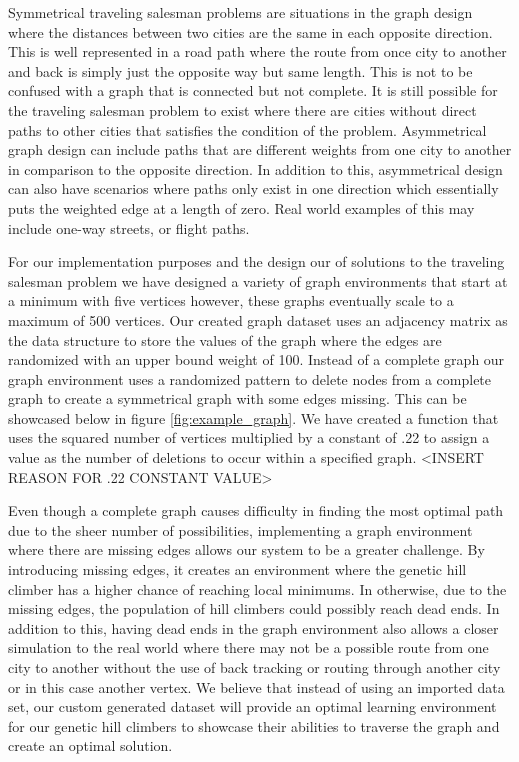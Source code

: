 \documentclass[sigplan,screen]{acmart}
\begin{document}
Symmetrical traveling salesman problems are situations in the graph design where
the distances between two cities are the same in each opposite direction. This
is well represented in a road path where the route from once city to another and
back is simply just the opposite way but same length. This is not to be confused
with a graph that is connected but not complete. It is still possible for the
traveling salesman problem to exist where there are cities without direct paths
to other cities that satisfies the condition of the problem. Asymmetrical graph
design can include paths that are different weights from one city to another in
comparison to the opposite direction. In addition to this, asymmetrical design
can also have scenarios where paths only exist in one direction which
essentially puts the weighted edge at a length of zero. Real world examples of this
may include one-way streets, or flight paths.

For our implementation purposes and the design our of solutions to the traveling
salesman problem we have designed a variety of graph environments that start at
a minimum with five vertices however, these graphs eventually scale to a maximum
of 500 vertices. Our created graph dataset uses an adjacency matrix as the data
structure to store the values of the graph where the edges are randomized with
an upper bound weight of 100. Instead of a complete graph our graph environment
uses a randomized pattern to delete nodes from a complete graph to create a
symmetrical graph with some edges missing. This can be showcased below in figure
\ref{fig:example_graph}. We have created a function that uses the
squared number of vertices multiplied by a constant of .22 to assign a value as
the number of deletions to occur within a specified graph. <INSERT REASON FOR
.22 CONSTANT VALUE>

Even though a complete graph causes difficulty in finding the most
optimal path due to the sheer number of possibilities, implementing a graph
environment where there are missing edges allows our system to be a greater
challenge. By introducing missing edges, it creates an environment where the
genetic hill climber has a higher chance of reaching local minimums. In
otherwise, due to the missing edges, the population of hill climbers could
possibly reach dead ends. In addition to this, having dead ends in the graph
environment also allows a closer simulation to the real world where there may
not be a possible route from one city to another without the use of back
tracking or routing through another city or in this case another vertex. We
believe that instead of using an imported data set, our custom generated dataset
will provide an optimal learning environment for our genetic hill climbers to
showcase their abilities to traverse the graph and create an optimal solution.
\end{document}
